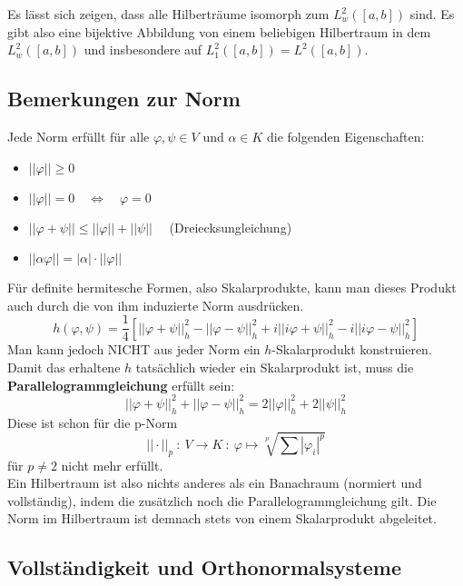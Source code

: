 \documentclass[a4paper,12pt,portrait]{book}
\numberwithin{equation}{section}
\begin{document}
Es lässt sich zeigen, dass alle Hilberträume isomorph zum $L_w^2([a,b])$ sind. Es gibt also eine bijektive Abbildung von einem beliebigen Hilbertraum in dem $L_w^2([a,b])$ und insbesondere auf $L_1^2([a,b])=L^2([a,b])$.
\newpage
\subsection{Bemerkungen zur Norm}

Jede Norm erfüllt für alle $\varphi,\psi\in V$ und $\alpha\in K$ die folgenden Eigenschaften:

\begin{itemize}
	\item $||\varphi|| \geq 0$
	\item $||\varphi|| = 0 \quad\Leftrightarrow\quad \varphi = 0$
	\item $||\varphi + \psi|| \leq ||\varphi|| + ||\psi||\quad$ (Dreiecksungleichung)
	\item $||\alpha\varphi||=|\alpha|\cdot||\varphi||$
\end{itemize}

Für definite hermitesche Formen, also Skalarprodukte, kann man dieses Produkt auch durch die von ihm induzierte Norm ausdrücken.
\begin{equation*}
h(\varphi,\psi)=\frac{1}{4}\left[||\varphi+\psi||_h^2 - ||\varphi-\psi||_h^2 + i||i\varphi + \psi||_h^2 - i||i\varphi-\psi||_h^2\right]
\end{equation*}
Man kann jedoch NICHT aus jeder Norm ein $h$-Skalarprodukt konstruieren. Damit das erhaltene $h$ tatsächlich wieder ein Skalarprodukt ist, muss die \textbf{Parallelogrammgleichung} erfüllt sein:
\begin{equation*}
||\varphi+\psi||_h^2 + ||\varphi-\psi||_h^2=2||\varphi||_h^2 + 2||\psi||_h^2
\end{equation*}
Diese ist schon für die p-Norm
\begin{equation*}
||\cdot||_p\ :\ V\rightarrow K\ :\ \varphi\mapsto \sqrt[p]{\sum|\varphi_i|^p}
\end{equation*}
für $p\neq 2$ nicht mehr erfüllt. \\

Ein Hilbertraum ist also nichts anderes als ein Banachraum (normiert und vollständig), indem die zusätzlich noch die Parallelogrammgleichung gilt. Die Norm im Hilbertraum ist demnach stets von einem Skalarprodukt abgeleitet.

\subsection{Vollständigkeit und Orthonormalsysteme}
\end{document}
